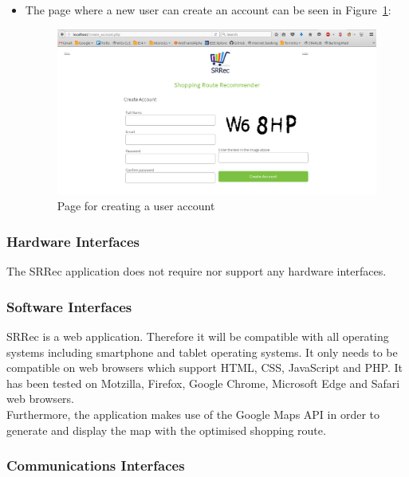 \documentclass[10pt,twocolumn]{witseiepaper}
\begin{document}
\begin{itemize}
			\item The page where a new user can create an account can be seen in Figure~\ref{create account page}:
			\begin{figure}[htbp]
				\centering
				\includegraphics[width = \columnwidth]{../images/create_account_new.png}
				\caption{Page for creating a user account}
				\label{create account page}
			\end{figure}
			
		\end{itemize}
		
		\subsubsection{Hardware Interfaces}
		
		The SRRec application does not require nor support any hardware interfaces.
		
		\subsubsection{Software Interfaces}
		
		SRRec is a web application. Therefore it will be compatible with all operating systems including smartphone and tablet operating systems. It only needs to be compatible on web browsers which support HTML, CSS, JavaScript and PHP. It has been tested on Motzilla, Firefox, Google Chrome, Microsoft Edge and Safari web browsers. \\
		
		Furthermore, the application makes use of the Google Maps API in order to generate and display the map with the optimised shopping route. 
		
		\subsubsection{Communications Interfaces}
		
\end{document}
